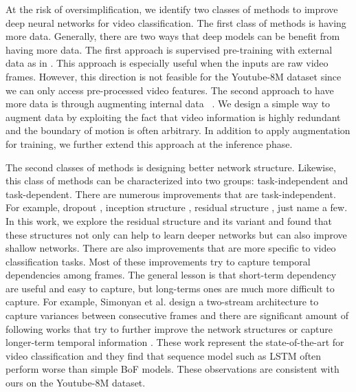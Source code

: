 \documentclass[10pt,twocolumn,letterpaper]{article}
\begin{document}
At the risk of oversimplification, we identify two classes of methods to improve deep neural networks for video classification. The first class of methods is having more data. Generally, there are two ways that deep models can be benefit from having more data. The first approach is supervised pre-training with external data as in \cite{wang2015towards, wang2016temporal}. This approach is especially useful when the inputs are raw video frames. However, this direction is not feasible for the Youtube-8M dataset since we can only access pre-processed video features. The second approach to have more data is through augmenting internal data ~\cite{wang2015towards}. We design a simple way to augment data by exploiting the fact that video information is highly redundant and the boundary of motion is often arbitrary. In addition to apply augmentation for training, we further extend this approach at the inference phase. 

The second classes of methods is designing better network structure. Likewise, this class of methods can be characterized into two groups: task-independent and task-dependent. There are numerous improvements that are task-independent. For example, dropout \cite{srivastava2014dropout}, inception structure \cite{szegedy2015going}, residual structure \cite{he2016deep}, just name a few. In this work, we explore the residual structure \cite{he2016deep} and its variant \cite{bansal2017pixelnet} and found that these structures not only can help to learn deeper networks but can also improve shallow networks. There are also improvements that are more specific to video classification tasks. Most of these improvements try to capture temporal dependencies among frames. The general lesson is that short-term dependency are useful and easy to capture, but long-terms ones are much more difficult to capture. For example, Simonyan et al. \cite{twostream2014} design a two-stream architecture to capture variances between consecutive frames and there are significant amount of following works that try to further improve the network structures \cite{wang2015towards} or capture longer-term temporal information \cite{diba_tle_2016, wang2016temporal, deep_quantization_16, dovf_lan_2017, VideoLSTM2016}. These work represent the state-of-the-art for video classification and they find that sequence model such as LSTM often perform worse than simple BoF models. These observations are consistent with ours on the Youtube-8M dataset. 
\end{document}
